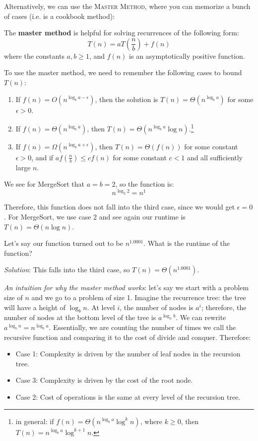 \documentclass[11pt]{article}
\begin{document}
Alternatively, we can use the \textsc{Master Method}, where you can memorize a bunch of cases (i.e. is a cookbook method):
\begin{tcolorbox}
The \textbf{master method} is helpful for solving recurrences of the following form:
$$ T(n) = aT(\frac{n}{b}) + f(n) $$
where the constants $a,b \geq 1$, and $f(n)$ is an asymptotically positive function.
\end{tcolorbox}
To use the master method, we need to remember the following cases to bound $T(n)$:
\begin{enumerate}
    \item If $f(n) = O(n^{\log_b{a} - \epsilon})$, then the solution is $T(n) = \Theta(n^{\log_b{a}})$ for some $\epsilon > 0$.
    \item If $f(n) = \Theta(n^{\log_b a})$, then $T(n) = \Theta(n^{\log_b{a}} \log{n})$.\footnote{in general: if $f(n) = \Theta(n^{\log_b{a}} \log^k n)$, where $k \geq 0$, then $T(n) = n^{\log_b{a}}\log^{k+1}n$.}
    \item If $f(n) = \Omega(n^{\log_b{a} + \epsilon})$, then $T(n) = \Theta(f(n))$ for some constant $\epsilon > 0$, and if $a f(\frac{n}{b}) \leq c f(n)$ for some constant $c < 1$ and all sufficiently large $n$.
\end{enumerate}
We see for MergeSort that $a = b = 2$, so the function is:
$$ n^{\log_2 2} = n^1$$

Therefore, this function does not fall into the third case, since we would get $\epsilon = 0$. For MergeSort, we use case 2 and see again our runtime is $T(n) = \Theta(n \log n)$.

\begin{exmp}
Let's say our function turned out to be $n^{1.0001}$. What is the runtime of the function?
\end{exmp}
\hspace{2em} \textit{Solution}: This falls into the third case, so $T(n) = \Theta(n^{1.0001})$.

\textit{An intuition for why the master method works}: let's say we start with a problem size of $n$ and we go to a problem of size 1. Imagine the recurrence tree: the tree will have a height of $\log_b{n}$. At level $i$, the number of nodes is $a^i$; therefore, the number of nodes at the bottom level of the tree is $a^{\log_n{b}}$. We can rewrite $a^{\log_b{n}} = n^{\log_b{a}}$. Essentially, we are counting the number of times we call the recursive function and comparing it to the cost of divide and conquer. Therefore:
\begin{itemize}
    \item Case 1: Complexity is driven by the number of leaf nodes in the recursion tree.
    \item Case 3: Complexity is driven by the cost of the root node.
    \item Case 2: Cost of operations is the same at every level of the recursion tree.
\end{itemize}
\end{document}
